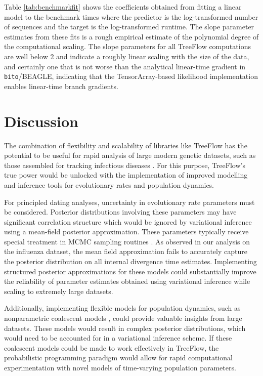 Table \ref{tab:benchmarkfit} shows the coefficients obtained from fitting a linear model to the benchmark times where the predictor is the log-transformed number of sequences and the target is the log-transformed runtime. The slope parameter estimates from these fits is a rough empirical estimate of the polynomial degree of the computational scaling. The slope parameters for all TreeFlow computations are well below 2 and indicate a roughly linear scaling with the size of the data, and certainly one that is not worse than the analytical linear-time gradient in \texttt{bito}/BEAGLE, indicating that the TensorArray-based likelihood implementation enables linear-time branch gradients.


\section{Discussion}

The combination of flexibility and scalability of libraries like TreeFlow has the potential to be useful for rapid analysis of large modern genetic datasets, such as those assembled for tracking infectious diseases \cite{hadfield2018nextstrain}. For this purpose, TreeFlow's true power would be unlocked with the implementation of improved modelling and inference tools for evolutionary rates and population dynamics.

For principled dating analyses, uncertainty in evolutionary rate parameters must be considered. Posterior distributions involving these parameters may have significant correlation structure which would be ignored by variational inference using a mean-field posterior approximation. These parameters typically receive special treatment in MCMC sampling routines \cite{drummond2006relaxed, zhang2020improving}. As observed in our analysis on the influenza dataset, the mean field approximation fails to accurately capture the posterior distribution on all internal divergence time estimates. Implementing structured posterior approximations for these models could substantially improve the reliability of parameter estimates obtained using variational inference while scaling to extremely large datasets.

Additionally, implementing flexible models for population dynamics, such as nonparametric coalescent models \cite{drummond2005bayesian, minin2008smooth, gill2013improving}, could provide valuable insights from large datasets. These models would result in complex posterior distributions, which would need to be accounted for in a variational inference scheme. If these coalescent models could be made to work effectively in TreeFlow, the probabilistic programming paradigm would allow for rapid computational experimentation with novel models of time-varying population parameters.

